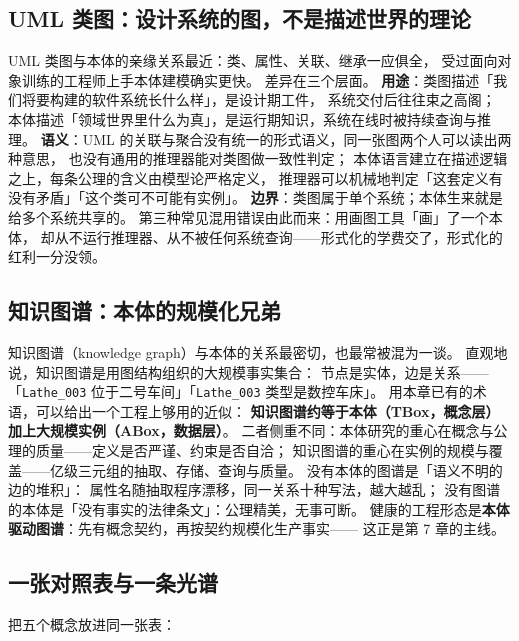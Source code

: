 \subsection{UML 类图：设计系统的图，不是描述世界的理论}

UML 类图与本体的亲缘关系最近：类、属性、关联、继承一应俱全，
受过面向对象训练的工程师上手本体建模确实更快。
差异在三个层面。
\textbf{用途}：类图描述「我们将要构建的软件系统长什么样」，是设计期工件，
系统交付后往往束之高阁；
本体描述「领域世界里什么为真」，是运行期知识，系统在线时被持续查询与推理。
\textbf{语义}：UML 的关联与聚合没有统一的形式语义，同一张图两个人可以读出两种意思，
也没有通用的推理器能对类图做一致性判定；
本体语言建立在描述逻辑之上，每条公理的含义由模型论严格定义，
推理器可以机械地判定「这套定义有没有矛盾」「这个类可不可能有实例」。
\textbf{边界}：类图属于单个系统；本体生来就是给多个系统共享的。
第三种常见混用错误由此而来：用画图工具「画」了一个本体，
却从不运行推理器、从不被任何系统查询——形式化的学费交了，形式化的红利一分没领。

\subsection{知识图谱：本体的规模化兄弟}

知识图谱（knowledge graph）与本体的关系最密切，也最常被混为一谈。
直观地说，知识图谱是用图结构组织的大规模事实集合：
节点是实体，边是关系——「\texttt{Lathe\_003} 位于二号车间」「\texttt{Lathe\_003} 类型是数控车床」。
用本章已有的术语，可以给出一个工程上够用的近似：
\textbf{知识图谱约等于本体（TBox，概念层）加上大规模实例（ABox，数据层）}。
二者侧重不同：本体研究的重心在概念与公理的质量——定义是否严谨、约束是否自洽；
知识图谱的重心在实例的规模与覆盖——亿级三元组的抽取、存储、查询与质量。
没有本体的图谱是「语义不明的边的堆积」：
属性名随抽取程序漂移，同一关系十种写法，越大越乱；
没有图谱的本体是「没有事实的法律条文」：公理精美，无事可断。
健康的工程形态是\textbf{本体驱动图谱}：先有概念契约，再按契约规模化生产事实——
这正是第 7 章的主线。

\subsection{一张对照表与一条光谱}

把五个概念放进同一张表：

